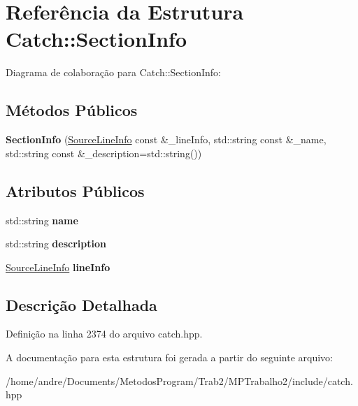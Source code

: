 \hypertarget{structCatch_1_1SectionInfo}{}\section{Referência da Estrutura Catch\+:\+:Section\+Info}
\label{structCatch_1_1SectionInfo}


Diagrama de colaboração para Catch\+:\+:Section\+Info\+:
\subsection*{Métodos Públicos}
\begin{DoxyCompactItemize}
\item 
{\bfseries Section\+Info} (\hyperlink{structCatch_1_1SourceLineInfo}{Source\+Line\+Info} const \&\+\_\+line\+Info, std\+::string const \&\+\_\+name, std\+::string const \&\+\_\+description=std\+::string())\hypertarget{structCatch_1_1SectionInfo_a27aff3aaf8b6611f3651b17111a272c6}{}\label{structCatch_1_1SectionInfo_a27aff3aaf8b6611f3651b17111a272c6}

\end{DoxyCompactItemize}
\subsection*{Atributos Públicos}
\begin{DoxyCompactItemize}
\item 
std\+::string {\bfseries name}\hypertarget{structCatch_1_1SectionInfo_a704c8fc662d309137e0d4f199cb7df58}{}\label{structCatch_1_1SectionInfo_a704c8fc662d309137e0d4f199cb7df58}

\item 
std\+::string {\bfseries description}\hypertarget{structCatch_1_1SectionInfo_a0052060219a6de74bb7ade34d4163a4e}{}\label{structCatch_1_1SectionInfo_a0052060219a6de74bb7ade34d4163a4e}

\item 
\hyperlink{structCatch_1_1SourceLineInfo}{Source\+Line\+Info} {\bfseries line\+Info}\hypertarget{structCatch_1_1SectionInfo_adbc83b8a3507c4acc8ee249e93465711}{}\label{structCatch_1_1SectionInfo_adbc83b8a3507c4acc8ee249e93465711}

\end{DoxyCompactItemize}


\subsection{Descrição Detalhada}


Definição na linha 2374 do arquivo catch.\+hpp.



A documentação para esta estrutura foi gerada a partir do seguinte arquivo\+:\begin{DoxyCompactItemize}
\item 
/home/andre/\+Documents/\+Metodos\+Program/\+Trab2/\+M\+P\+Trabalho2/include/catch.\+hpp\end{DoxyCompactItemize}
